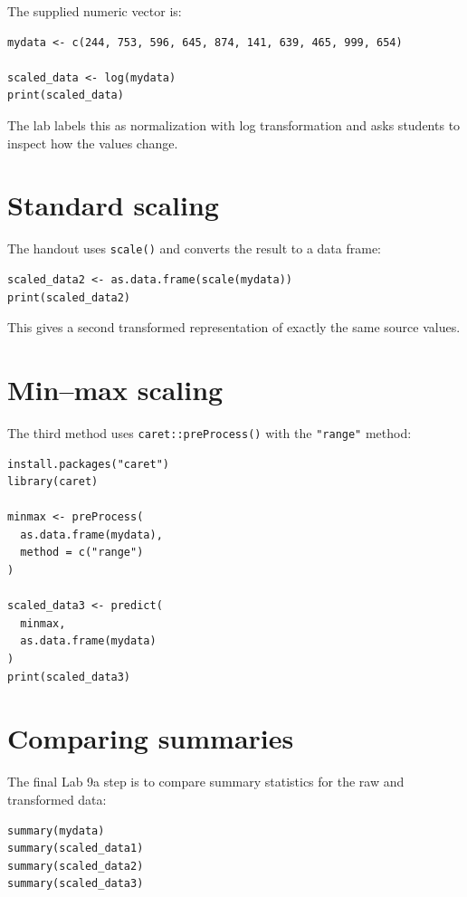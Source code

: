 The supplied numeric vector is:

\begin{lstlisting}[style=dsr]
mydata <- c(244, 753, 596, 645, 874, 141, 639, 465, 999, 654)

scaled_data <- log(mydata)
print(scaled_data)
\end{lstlisting}

The lab labels this as normalization with log transformation and asks students to inspect how the values change.

\section{Standard scaling}

The handout uses \texttt{scale()} and converts the result to a data frame:

\begin{lstlisting}[style=dsr]
scaled_data2 <- as.data.frame(scale(mydata))
print(scaled_data2)
\end{lstlisting}

This gives a second transformed representation of exactly the same source values.

\section{Min--max scaling}

The third method uses \texttt{caret::preProcess()} with the \texttt{"range"} method:

\begin{lstlisting}[style=dsr]
install.packages("caret")
library(caret)

minmax <- preProcess(
  as.data.frame(mydata),
  method = c("range")
)

scaled_data3 <- predict(
  minmax,
  as.data.frame(mydata)
)
print(scaled_data3)
\end{lstlisting}

\section{Comparing summaries}

The final Lab 9a step is to compare summary statistics for the raw and transformed data:

\begin{lstlisting}[style=dsr]
summary(mydata)
summary(scaled_data1)
summary(scaled_data2)
summary(scaled_data3)
\end{lstlisting}

